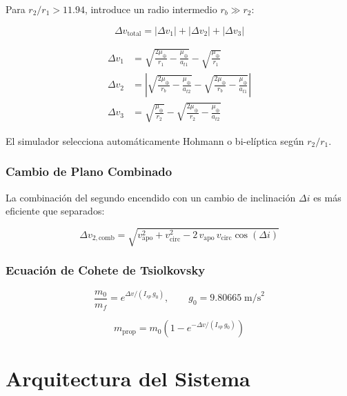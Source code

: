 \documentclass[12pt,a4paper]{article}
\newcommand{\dv}{\Delta v}
\newcommand{\dvtot}{\Delta v_{\text{total}}}
\newcommand{\muE}{\mu_{\oplus}}
\begin{document}
Para $r_2/r_1 > 11.94$, introduce un radio intermedio $r_b \gg r_2$:

\begin{equation}
  \dvtot = |\dv_1| + |\dv_2| + |\dv_3|
\end{equation}

\begin{align}
  \dv_1 &= \sqrt{\frac{2\muE}{r_1} - \frac{\muE}{a_{t1}}} - \sqrt{\frac{\muE}{r_1}} \\
  \dv_2 &= \left|\sqrt{\frac{2\muE}{r_b} - \frac{\muE}{a_{t2}}}
            - \sqrt{\frac{2\muE}{r_b} - \frac{\muE}{a_{t1}}}\right| \\
  \dv_3 &= \sqrt{\frac{\muE}{r_2}} - \sqrt{\frac{2\muE}{r_2} - \frac{\muE}{a_{t2}}}
\end{align}

El simulador selecciona autom\'aticamente Hohmann o bi-el\'iptica seg\'un $r_2/r_1$.

\subsubsection{Cambio de Plano Combinado}

La combinaci\'on del segundo encendido con un cambio de inclinaci\'on $\Delta i$ es m\'as eficiente que separados:

\begin{equation}
  \dv_{2,\text{comb}} = \sqrt{v_{\text{apo}}^2 + v_{\text{circ}}^2
    - 2\,v_{\text{apo}}\,v_{\text{circ}}\cos(\Delta i)}
\end{equation}

\subsubsection{Ecuaci\'on de Cohete de Tsiolkovsky}

\begin{equation}
  \frac{m_0}{m_f} = e^{\dv / (I_{sp}\,g_0)}, \qquad g_0 = 9.80665\;\text{m/s}^2
\end{equation}

\begin{equation}
  m_{\text{prop}} = m_0\!\left(1 - e^{-\dv/(I_{sp}\,g_0)}\right)
\end{equation}

\section{Arquitectura del Sistema}
\end{document}
